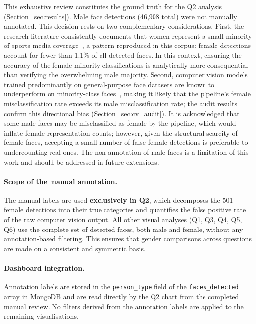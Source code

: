 \documentclass[11pt,a4paper]{article}
\begin{document}
This exhaustive review constitutes the ground truth for the Q2 analysis (Section~\ref{sec:results}). Male face detections (46{,}908 total) were not manually annotated. This decision rests on two complementary considerations. First, the research literature consistently documents that women represent a small minority of sports media coverage~\cite{CoE2022,Toffoletti2018}, a pattern reproduced in this corpus: female detections account for fewer than 1.1\% of all detected faces. In this context, ensuring the accuracy of the female minority classifications is analytically more consequential than verifying the overwhelming male majority. Second, computer vision models trained predominantly on general-purpose face datasets are known to underperform on minority-class faces~\cite{Buolamwini2018}, making it likely that the pipeline's female misclassification rate exceeds its male misclassification rate; the audit results confirm this directional bias (Section~\ref{sec:cv_audit}). It is acknowledged that some male faces may be misclassified as female by the pipeline, which would inflate female representation counts; however, given the structural scarcity of female faces, accepting a small number of false female detections is preferable to undercounting real ones. The non-annotation of male faces is a limitation of this work and should be addressed in future extensions.

\paragraph{Scope of the manual annotation.}
The manual labels are used \textbf{exclusively in Q2}, which decomposes the 501 female detections into their true categories and quantifies the false positive rate of the raw computer vision output. All other visual analyses (Q1, Q3, Q4, Q5, Q6) use the complete set of detected faces, both male and female, without any annotation-based filtering. This ensures that gender comparisons across questions are made on a consistent and symmetric basis.

\paragraph{Dashboard integration.}
Annotation labels are stored in the \texttt{person\_type} field of the \texttt{faces\_detected} array in MongoDB and are read directly by the Q2 chart from the completed manual review. No filters derived from the annotation labels are applied to the remaining visualisations.
\end{document}
